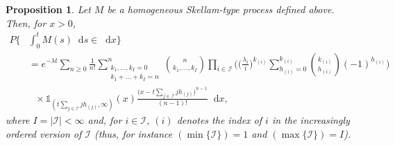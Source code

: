 \documentclass[12pt, twoside, english, headsepline]{article}
\newcommand*\dif{\mathop{}\!\mathrm{d}}  %
\newtheorem{proposition}{Proposition}[section] %
\theoremstyle{definition} %
\numberwithin{equation}{section} %
\begin{document}
\begin{proposition}
	Let $M$ be a homogeneous Skellam-type process defined above. Then, for $x>0$,
\begin{align}
	P\bigg\{&\int_0^t M(s)\dif s\in \dif x\bigg\} \nonumber\\
	&=  e^{-\lambda t} \sum_{n\ge0} \frac{1}{n!} \sum_{\substack{k_1,\dots,k_I=0\\k_1+\dots+k_I=n}}^n \binom{n}{k_1,\dots, k_I} \prod_{i\in\mathcal{I}} \Bigg( \bigg(\frac{\lambda_i}{i}\bigg)^{k_{(i)}}  \sum_{h_{(i)} = 0}^{k_{(i)}} \binom{k_{(i)}}{h_{(i)}} (-1)^{h_{(i)}} \Bigg)\nonumber \\
	&\ \ \ \times\mathds{1}_{(t\sum_{j\in\mathcal{I}} j h_{(j)} ,\infty)}(x) \frac{\big(x-t\sum_{j\in\mathcal{I}} j h_{(j)}\big)^{n-1}}{(n-1)!}\dif x, \label{probabilitaEsplicitaIntegraleSkemllamGeneralizzato}
\end{align}
where $I = |\mathcal{I}|<\infty$ and, for $i\in\mathcal{I}$, $(i)$ denotes the index of $i$ in the increasingly ordered version of $\mathcal{I}$ (thus, for instance $(\min\{\mathcal{I}\}) = 1$ and $(\max\{\mathcal{I}\}) = I$).
\end{proposition}
\end{document}
